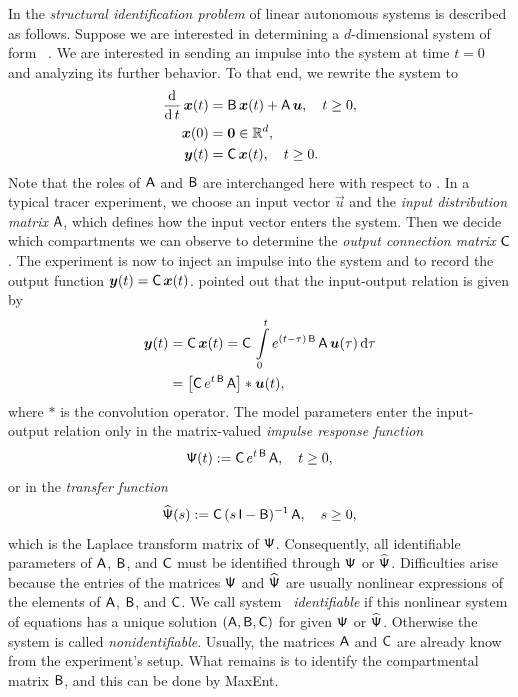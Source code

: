 \documentclass[smallextended]{svjour3}
\makeatletter
\renewcommand*{\eqref}[1]{%
  \hyperref[{#1}]{\textup{\tagform@{\ref*{#1}}}}%
}
\newcommand{\R}{\mathbb{R}}
\newcommand{\intl}{\int\limits}
\newcommand{\deriv}[1]{\frac{\operatorname{d}}{\operatorname{d}#1}}
\newcommand{\dd}[1]{\,\mathrm{d}#1}
\makeatother
\begin{document}
In \citet[Chapter~16]{Anderson1983} the \emph{structural identification problem} of linear autonomous systems is described as follows.
Suppose we are interested in determining a $d$-dimensional system of form~\eqref{eqn:lin_CS_sys}.
We are interested in sending an impulse into the system at time $t=0$ and analyzing its further behavior.
To that end, we rewrite the system to
\begin{equation}\label{eqn:ABC_system}
	\begin{aligned}
		\deriv{t}\,\vec{x}(t) &= \tens{B}\,\vec{x}(t) + \tens{A}\,\vec{u},	\quad t\geq0,\\
		\vec{x}(0) &= \vec{0}\in\R^d,\\
		\vec{y}(t) &= \tens{C}\,\vec{x}(t),\quad t\geq0.
	\end{aligned}
\end{equation}
Note that the roles of $\mathsf{A}$ and $\mathsf{B}$ are interchanged here with respect to \citet{Anderson1983}.
In a typical tracer experiment, we choose an input vector $\vec{u}$ and the \emph{input distribution matrix} $\mathsf{A}$, which defines how the input vector enters the system.
Then we decide which compartments we can observe to determine the \emph{output connection matrix} $\mathsf{C}$.
The experiment is now to inject an impulse into the system and to record the output function $\vec{y}(t) =\tens{C}\,\vec{x}(t)$.
\citet{Bellman1970MBS} pointed out that the input-output relation is given by
\begin{align*}
	\vec{y}(t) &= \tens{C}\,\vec{x}(t) = \tens{C}\,\intl_0^t e^{(t-\tau)\,\tens{B}}\,\tens{A}\,\vec{u}(\tau)\dd{\tau}\\
	&= \left[\tens{C}\,e^{t\,\tens{B}}\,\tens{A}\right] * \vec{u}(t),
\end{align*}
where $*$ is the convolution operator.
The model parameters enter the input-output relation only in the matrix-valued \emph{impulse response function}
\begin{equation*}
	\mathsf{\Psi}(t):=\mathsf{C}\,e^{t\,\mathsf{B}}\,\mathsf{A},\quad t\geq0,
\end{equation*}
or in the \emph{transfer function}
\begin{equation*}
	\widehat{\mathsf{\Psi}}(s) := \mathsf{C}\,(s\,\mathsf{I}-\mathsf{B})^{-1}\,\mathsf{A}, \quad s\geq0,
\end{equation*}
which is the Laplace transform matrix of $\mathsf{\Psi}$.
Consequently, all identifiable parameters of $\mathsf{A}$, $\mathsf{B}$, and $\mathsf{C}$ must be identified through $\mathsf{\Psi}$ or $\widehat{\mathsf{\Psi}}$.
Difficulties arise because the entries of the matrices $\mathsf{\Psi}$ and $\widehat{\mathsf{\Psi}}$ are usually nonlinear expressions of the elements of $\mathsf{A}$, $\mathsf{B}$, and $\mathsf{C}$.
We call system~\eqref{eqn:ABC_system} \emph{identifiable} if this nonlinear system of equations has a unique solution $(\mathsf{A},\mathsf{B},\mathsf{C})$ for given $\mathsf{\Psi}$ or $\widehat{\mathsf{\Psi}}$.
Otherwise the system is called \emph{nonidentifiable}.
Usually, the matrices $\mathsf{A}$ and $\mathsf{C}$ are already know from the experiment's setup.
What remains is to identify the compartmental matrix $\mathsf{B}$, and this can be done by MaxEnt.
\end{document}
